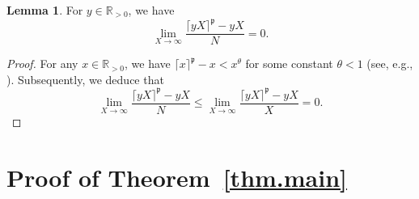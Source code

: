 \documentclass{amsart}
\theoremstyle{definition}
\newtheorem {lemma}[theorem]{Lemma}
\newcommand{\prceil}{\rceil^{\mathfrak p}}
\numberwithin{equation}{section}
\begin{document}
\begin{lemma}
For $y\in\mathbb{R}_{>0}$, we have
\begin{equation} \label{eq.yx} 
\lim_{X \to \infty} \frac{ \lceil yX \prceil - yX}N =0. \end{equation} 
\end{lemma}

\begin{proof}
For any $x\in\mathbb{R}_{>0}$, we have $\lceil x\prceil-x<x^\theta$ for some constant $\theta <1$ (see, e.g., \cite{BHP}). Subsequently, we deduce that
\[\lim_{X \to \infty} \frac{ \lceil yX \prceil - yX}N \le \lim_{X \to \infty} \frac{ \lceil yX \prceil - yX}X=0. \]
\end{proof}

\section{Proof of Theorem~\ref{thm.main}}\label{s:prime}
\end{document}
